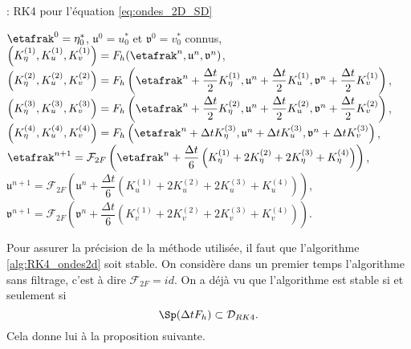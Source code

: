 \begin{center}
\begin{minipage}[H]{12cm}
  \begin{algorithm}[H]
    \caption{: RK4 pour l'équation \eqref{eq:ondes_2D_SD}}\label{alg:RK4_ondes2d}
    \begin{algorithmic}[1]
    \State $\etafrak^0 = \eta_0^*$, $\mathfrak{u}^0 = u_0^*$ et $\mathfrak{v}^0 = v_0^*$ connus,
             \State  $\left(K^{(1)}_{\eta}, K^{(1)}_{u}, K^{(1)}_{v}\right) = F_h(\etafrak^n, \mathfrak{u}^n, \mathfrak{v}^n)$,
             \State  $\left(K^{(2)}_{\eta}, K^{(2)}_{u}, K^{(2)}_{v}\right) = F_h\left(\etafrak^n + \dfrac{\Delta t}{2}K^{(1)}_{\eta}, \mathfrak{u}^n + \dfrac{\Delta t}{2}K^{(1)}_{u}, \mathfrak{v}^n + \dfrac{\Delta t}{2}K^{(1)}_{v}\right)$,
             \State   $\left(K^{(3)}_{\eta}, K^{(3)}_{u}, K^{(3)}_{v}\right) = F_h\left(\etafrak^n + \dfrac{\Delta t}{2}K^{(2)}_{\eta}, \mathfrak{u}^n + \dfrac{\Delta t}{2}K^{(2)}_{u}, \mathfrak{v}^n + \dfrac{\Delta t}{2}K^{(2)}_{v}\right)$,
             \State   $\left(K^{(4)}_{\eta}, K^{(4)}_{u}, K^{(4)}_{v}\right) = F_h\left(\etafrak^n + \Delta t K^{(3)}_{\eta}, \mathfrak{u}^n + \Delta tK^{(3)}_{u}, \mathfrak{v}^n + \Delta t K^{(3)}_{v}\right)$,
             \State  $\etafrak^{n+1} = \mathcal{F}_{2F}\left( \etafrak^n  + \dfrac{\Delta t}{6} \left( K^{(1)}_{\eta} + 2 K^{(2)}_{\eta} + 2 K^{(3)}_{\eta} + K^{(4)}_{\eta} \right) \right)$,
             \State  $\mathfrak{u}^{n+1} = \mathcal{F}_{2F}\left( \mathfrak{u}^n  + \dfrac{\Delta t}{6} \left( K^{(1)}_{u} + 2 K^{(2)}_{u} + 2 K^{(3)}_{u} + K^{(4)}_{u} \right) \right)$,
             \State  $\mathfrak{v}^{n+1} = \mathcal{F}_{2F}\left( \mathfrak{v}^n  + \dfrac{\Delta t}{6} \left( K^{(1)}_{v} + 2 K^{(2)}_{v} + 2 K^{(3)}_{v} + K^{(4)}_{v} \right) \right)$.
            \EndFor
    \end{algorithmic}
    \end{algorithm}
\end{minipage}
\end{center}
Pour assurer la précision de la méthode utilisée, il faut que l'algorithme \eqref{alg:RK4_ondes2d} soit stable. On considère dans un premier temps l'algorithme sans filtrage, c'est à dire $\mathcal{F}_{2F}=id$. On a déjà vu que l'algorithme est stable si et seulement si
\begin{equation}
\Sp ( \Delta t F_h ) \subset \mathcal{D}_{RK4}.
\end{equation}
Cela donne lui à la proposition suivante.

